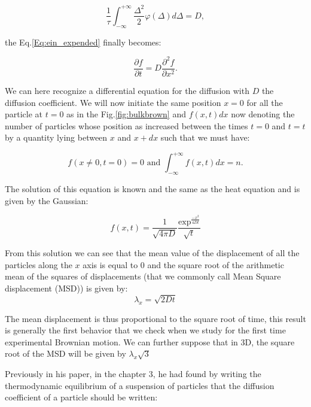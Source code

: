 \begin{equation}
	\frac{1}{\tau} \int_{-\infty}^{+\infty} \frac{\Delta^2}{2}\varphi(\Delta)d\Delta =D,
\end{equation}

the Eq.\ref{Eq:ein_expended} finally becomes:

\begin{equation}
	\frac{\partial f}{\partial t} = D \frac{\partial ^2 f}{\partial x ^2}.
\end{equation}


We can here recognize a differential equation for the diffusion with $D$ the diffusion coefficient. We will now initiate the same position $x=0$ for all the particle at $t=0$ as in the Fig.\ref{fig:bulkbrown} and $f(x,t)dx$ now denoting the number of particles whose position as increased between the times  $t=0$ and $t=t$  by a quantity lying between $x$ and $x + dx$ such that we must have:

\begin{equation}
	f(x \ne 0, t=0) = 0 \text{ and } \int_{-\infty}^{+\infty}f(x,t)dx = n.
\end{equation}

The solution of this equation is known and the same as the heat equation and is given by the Gaussian:


\begin{equation}
	f(x,t) = \frac{1}{\sqrt{4\pi D}} \frac{\mathrm{exp}^{\frac{-x^2}{4Dt}}}{\sqrt{t}}
\end{equation}

From this solution we can see that the mean value of the displacement of all the particles along the $x$ axis is equal to $0$ and the square root of the arithmetic mean of the squares of displacements (that we commonly call Mean Square displacement (\gls{MSD}))  is given by:
\begin{equation}
	\lambda _x = \sqrt{2Dt}
	\label{Eq:MSD_ein}
\end{equation}

The mean displacement is thus proportional to the square root of time, this result is generally the first behavior that we check when we study for the first time experimental Brownian motion. We can further suppose that in 3D, the square root of the \gls{MSD} will be given by $\lambda_x \sqrt{3}$

Previously in his paper, in the chapter 3, he had found by writing the thermodynamic equilibrium of a suspension of particles that the diffusion coefficient of a particle should be written:

